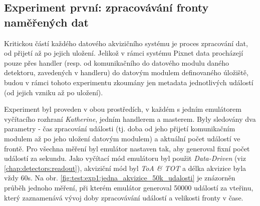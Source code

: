 \subsection{Experiment první: zpracovávání fronty naměřených dat}
Kritickou částí každého datového akvizičního systému je proces zpracování dat, od přijetí až po jejich uložení. Jelikož v rámci systému Pixnet data procházejí pouze přes handler (resp. od komunikačního do datového modulu daného detektoru, zavedených v handleru) do datovým modulem definovaného úložiště, budou v rámci tohoto experimentu zkoumány jen metadata jednotlivých událostí (od jejich vzniku až po uložení).

Experiment byl proveden v obou prostředích, v každém s jedním emulátorem vyčítacího rozhraní \textit{Katherine}, jedním handlerem a masterem. Byly sledovány dva parametry - čas zpracování události (tj. doba od jeho přijetí komunikačním modulem až po jeho uložení datovým modulem) a aktuální počet událostí ve frontě. Pro všechna měření byl emulátor nastaven tak, aby generoval fixní počet událostí za sekundu. Jako vyčítací mód emulátoru byl použit \textit{Data-Driven} (viz \ref{chap:detectors:readout}), akviziční mód byl \textit{ToA \& TOT} a délka akvizice byla vždy \unit{60}{s}. Na obr. \ref{fig:test:exp1:jedna_akvizice_50k_udalosti} je znázorněn průběh jednoho měření, při kterém emulátor generoval 50000 událostí za vteřinu, který zaznamenává vývoj doby zpracovávání událostí a velikosti fronty v čase.


